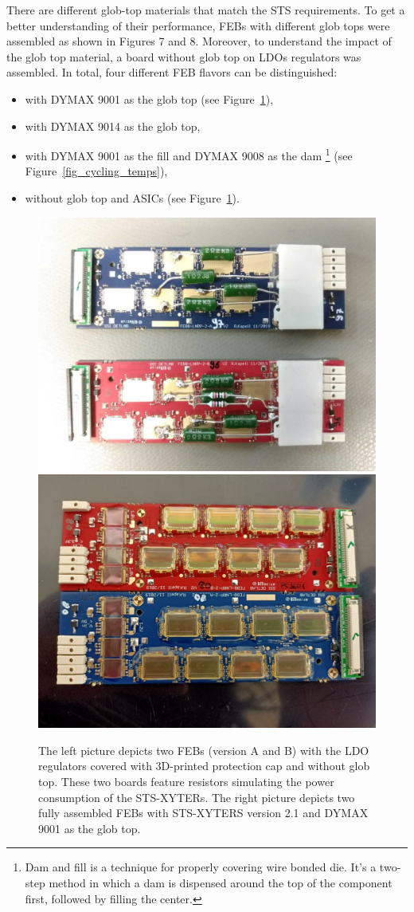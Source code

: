 There are different glob-top materials that match the \gls{STS} requirements. To get a better understanding of
their performance, \glspl{FEB} with different glob tops were assembled as shown in Figures 7 and 8. Moreover,
to understand the impact of the glob top material, a board without glob top on \glspl{LDO} regulators was
assembled. In total, four different FEB flavors can be distinguished:
\begin{itemize}
    \item with DYMAX 9001 as the glob top (see Figure~\ref{fig_noglobtop}),
    \item with DYMAX 9014 as the glob top,
    \item with DYMAX 9001 as the fill and DYMAX 9008 as the dam \footnote{Dam and fill is a technique for properly covering wire bonded die. It's a two-step method in which a dam is dispensed around the top of the component first, followed by filling the center.} (see Figure~\ref{fig_cycling_temps}), 
    \item without glob top and \glspl{ASIC} (see Figure~\ref{fig_noglobtop}).
    \end{itemize}
\begin{figure}[!h]
\centering
\includegraphics[width=0.45\columnwidth]{Chapter4/images/noglobtop.jpg}
\includegraphics[width=0.45\columnwidth]{Chapter4/images/globtop.jpg}
\caption{The left picture depicts two \glspl{FEB} (version A and B) with the \gls{LDO} regulators covered with 3D-printed protection cap and without glob top. These two boards feature resistors simulating the power consumption of the STS-XYTERs.
The right picture depicts two fully assembled \gls{FEB}s with STS-XYTERS version 2.1 and DYMAX 9001 as the glob top.}
\label{fig_noglobtop}
\end{figure}

